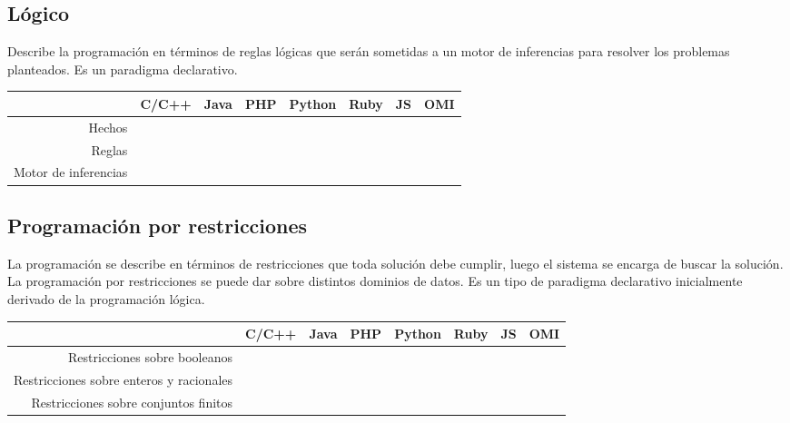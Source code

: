 \subsection{Lógico}
Describe la programación en términos de reglas lógicas  que serán sometidas
a un motor de inferencias para resolver los problemas planteados. 
Es un paradigma declarativo. 

\FloatBarrier
\begin{table}[h]
\begin{center}
 
\begin{tabular}{|r|c|c|c|c|c|c|c|} \hline
 & C/C++ & Java & PHP  & Python & Ruby & JS & OMI\\ \hline
Hechos & & & & & & &  \\ \hline
Reglas & & & & & & &  \\ \hline
Motor de inferencias & & & & & & &  \\ \hline
\end{tabular}
\end{center}
\end{table}
\FloatBarrier

\subsection{Programación por restricciones}
La programación se describe en términos de restricciones que toda solución debe cumplir, luego el
sistema se encarga de buscar la solución. La programación por restricciones se puede dar sobre distintos
dominios de datos. Es un tipo de paradigma declarativo inicialmente derivado de la programación lógica.

\FloatBarrier
\begin{table}[h]
\begin{center}
 
\begin{tabular}{|r|c|c|c|c|c|c|c|} \hline
 & C/C++ & Java & PHP  & Python & Ruby & JS & OMI\\ \hline
Restricciones sobre booleanos& & & & & & &  \\ \hline
Restricciones sobre enteros y racionales& & & & & & &  \\ \hline
Restricciones sobre conjuntos finitos & & & & & & &  \\ \hline
\end{tabular}
\end{center}
\end{table}
\FloatBarrier

